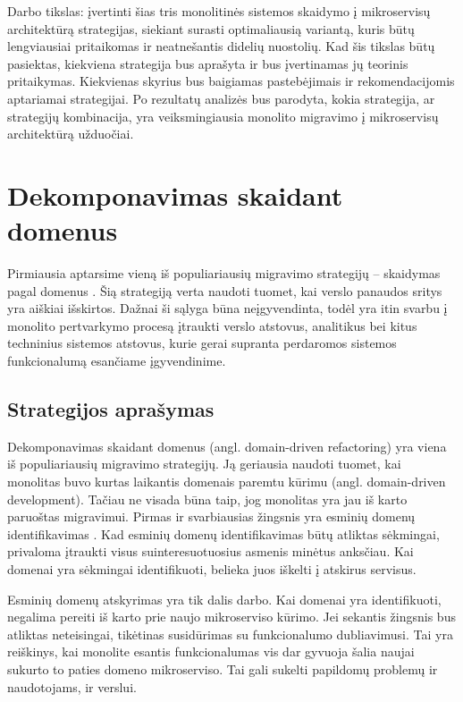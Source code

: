 \documentclass[fleqn]{VUMIFPSkursinis}
\begin{document}
Darbo tikslas: įvertinti šias tris monolitinės sistemos skaidymo į mikroservisų architektūrą strategijas, siekiant surasti optimaliausią variantą, kuris būtų lengviausiai pritaikomas ir neatnešantis didelių nuostolių. Kad šis tikslas būtų pasiektas, kiekviena strategija bus aprašyta ir bus įvertinamas jų teorinis pritaikymas. Kiekvienas skyrius bus baigiamas pastebėjimais ir rekomendacijomis aptariamai strategijai. Po rezultatų analizės bus parodyta, kokia strategija, ar strategijų kombinacija, yra veiksmingiausia monolito migravimo į mikroservisų architektūrą užduočiai.

\section{Dekomponavimas skaidant domenus}
Pirmiausia aptarsime vieną iš populiariausių migravimo strategijų – skaidymas pagal domenus \cite{Wal22}. Šią strategiją verta naudoti tuomet, kai verslo panaudos sritys yra aiškiai išskirtos. Dažnai  ši sąlyga būna neįgyvendinta, todėl yra itin svarbu į monolito pertvarkymo procesą įtraukti verslo atstovus, analitikus bei kitus techninius sistemos atstovus, kurie gerai supranta perdaromos sistemos funkcionalumą esančiame įgyvendinime.

\subsection{Strategijos aprašymas}
Dekomponavimas skaidant domenus (angl. domain-driven refactoring) yra viena iš populiariausių migravimo strategijų. Ją geriausia naudoti tuomet, kai monolitas buvo kurtas laikantis domenais paremtu kūrimu (angl. domain-driven development). Tačiau ne visada būna taip, jog monolitas yra jau iš karto paruoštas migravimui. Pirmas ir svarbiausias žingsnis yra esminių domenų identifikavimas \cite{LZ22}. Kad esminių domenų identifikavimas būtų atliktas sėkmingai, privaloma įtraukti visus suinteresuotuosius asmenis minėtus anksčiau. Kai domenai yra sėkmingai identifikuoti, belieka juos iškelti į atskirus servisus.


Esminių domenų atskyrimas yra tik dalis darbo. Kai domenai yra identifikuoti, negalima pereiti iš karto prie naujo mikroserviso kūrimo. Jei sekantis žingsnis bus atliktas neteisingai, tikėtinas susidūrimas su funkcionalumo dubliavimusi. Tai yra reiškinys, kai monolite esantis funkcionalumas vis dar gyvuoja šalia naujai sukurto to paties domeno mikroserviso. Tai gali sukelti papildomų problemų ir naudotojams, ir verslui.
\end{document}
